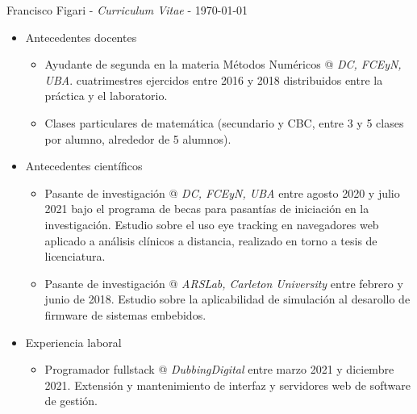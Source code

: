 \documentclass[a4paper]{article}
\begin{document}
\thispagestyle{empty}  %

Francisco Figari - \textit{Curriculum Vitae} - \monthyeardate\today

\begin{itemize}

  \item Antecedentes docentes
  \begin{itemize}

    \item
      Ayudante de segunda en la materia Métodos Numéricos @ \textit{DC, FCEyN,
      UBA}.   cuatrimestres ejercidos entre 2016 y 2018 distribuidos entre la
      práctica y el laboratorio.

    \item
      Clases particulares de matemática (secundario y CBC, entre 3 y 5 clases
      por alumno, alrededor de 5 alumnos).

  \end{itemize}

  \item Antecedentes científicos
  \begin{itemize}

    \item
      Pasante de investigación @ \textit{DC, FCEyN, UBA} entre agosto 2020 y
      julio 2021 bajo el programa de becas para pasantías de iniciación en la
      investigación. \newline
      Estudio sobre el uso eye tracking en navegadores web aplicado a análisis
      clínicos a distancia, realizado en torno a tesis de licenciatura.

    \item
      Pasante de investigación @ \textit{ARSLab, Carleton University} entre
      febrero y junio de 2018. \newline
      Estudio sobre la aplicabilidad de simulación al desarollo de firmware de
      sistemas embebidos.

  \end{itemize}

  \item Experiencia laboral
  \begin{itemize}

    \item
      Programador fullstack @ \textit{DubbingDigital} entre marzo 2021 y
      diciembre 2021.  \newline
      Extensión y mantenimiento de interfaz y servidores web de software de
      gestión.


\end{itemize}
\end{itemize}
\end{document}
